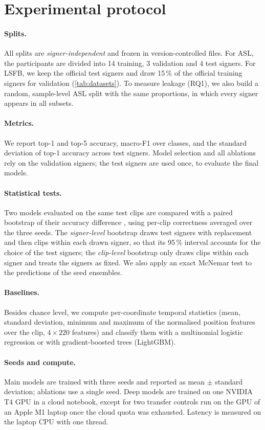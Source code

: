 \section{Experimental protocol}
\label{sec:protocol}

\paragraph{Splits.} All splits are \emph{signer-independent} and frozen in version-controlled
files. For ASL, the \numAslSigners{} participants are divided into 14 training, 3 validation and 4
test signers. For LSFB, we keep the official test signers and draw 15\,\% of the official training
signers for validation (\cref{tab:datasets}). To measure leakage (RQ1), we also build a random,
sample-level ASL split with the same proportions, in which every signer appears in all subsets.

\paragraph{Metrics.} We report top-1 and top-5 accuracy, macro-F1 over classes, and the standard
deviation of top-1 accuracy across test signers. Model selection and all ablations rely on the
validation signers; the test signers are used once, to evaluate the final models.

\paragraph{Statistical tests.} Two models evaluated on the same test clips are compared with a
paired bootstrap of their accuracy difference \citep{efron1993bootstrap}, using per-clip
correctness averaged over the three seeds. The \emph{signer-level} bootstrap draws test signers
with replacement and then clips within each drawn signer, so that its 95\,\% interval accounts for
the choice of the test signers; the \emph{clip-level} bootstrap only draws clips within each signer
and treats the signers as fixed. We also apply an exact McNemar test \citep{mcnemar1947note} to the
predictions of the seed ensembles.

\paragraph{Baselines.} Besides chance level, we compute per-coordinate temporal statistics (mean,
standard deviation, minimum and maximum of the normalised position features over the clip,
$4\times220$ features) and classify them with a multinomial logistic regression or with
gradient-boosted trees (LightGBM).

\paragraph{Seeds and compute.} Main models are trained with three seeds and reported as mean
$\pm$ standard deviation; ablations use a single seed. Deep models are trained on one NVIDIA T4 GPU
in a cloud notebook, except for two transfer controls run on the GPU of an Apple M1 laptop once
the cloud quota was exhausted. Latency is measured on the laptop CPU with one thread.
